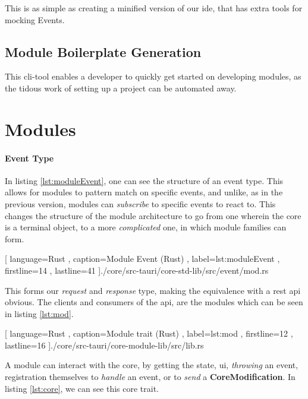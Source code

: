 This is as simple as creating a minified version of our \gls{ide}, that has
extra tools for mocking Events.

\subsection{Module Boilerplate Generation}


This \gls{cli}-tool enables a developer to quickly get started on developing
modules, as the tidous work of setting up a project can be automated away.

\section{Modules}

\paragraph{Event Type} In listing \ref{lst:moduleEvent}, one can see the
structure of an event type. This allows for modules to pattern match on specific
events, and unlike, as in the previous version, modules can \textit{subscribe}
to specific events to react to. This changes the structure of the module
architecture to go from one wherein the core is a terminal object, to a more
\textit{complicated} one, in which module families can form.

\begin{center}
  
    [ language=Rust
    , caption={Module Event (Rust)}
    , label=lst:moduleEvent
    , firstline=14
    , lastline=41
    ]{./core/src-tauri/core-std-lib/src/event/mod.rs}
\end{center}

This forms our \textit{request} and \textit{response} type, making the
equivalence with a \gls{rest} \gls{api} obvious. The clients and consumers
of the \gls{api}, are the modules which can be seen in listing \ref{lst:mod}.

\begin{center}
  
    [ language=Rust
    , caption={Module trait (Rust)}
    , label=lst:mod
    , firstline=12
    , lastline=16
    ]{./core/src-tauri/core-module-lib/src/lib.rs}
\end{center}

A module can interact with the core, by getting the state, \gls{ui},
\textit{throwing} an event, registration themselves to \textit{handle} an
event, or to \textit{send} a \textbf{CoreModification}. In listing
\ref{lst:core}, we can see this core trait.

